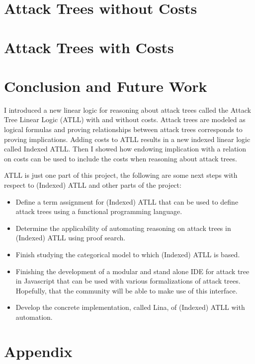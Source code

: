 \documentclass{llncs}
\begin{document}
\section{Attack Trees without Costs}
\label{sec:attack_trees_without_costs}


\section{Attack Trees with Costs}
\label{sec:attack_trees_with_costs}


\section{Conclusion and Future Work}
\label{sec:conclusion}
I introduced a new linear logic for reasoning about attack trees
called the Attack Tree Linear Logic (ATLL) with and without costs.
Attack trees are modeled as logical formulas and proving relationships
between attack trees corresponds to proving implications.  Adding
costs to ATLL results in a new indexed linear logic called Indexed
ATLL.  Then I showed how endowing implication with a relation on costs
can be used to include the costs when reasoning about attack trees.

ATLL is just one part of this project, the following are some next
steps with respect to (Indexed) ATLL and other parts of the project:
\begin{itemize}
\item Define a term assignment for (Indexed) ATLL that can be used to
  define attack trees using a functional programming language.
\item Determine the applicability of automating reasoning on attack
  trees in (Indexed) ATLL using proof search.  
\item Finish studying the categorical model to which (Indexed) ATLL is
  based.
\item Finishing the development of a modular and stand alone IDE for
  attack tree in Javascript that can be used with various
  formalizations of attack trees.  Hopefully, that the community will
  be able to make use of this interface.
\item Develop the concrete implementation, called Lina, of (Indexed)
  ATLL with automation.
\end{itemize}





\appendix

\section*{Appendix}
\label{sec:appendix}

\end{document}
